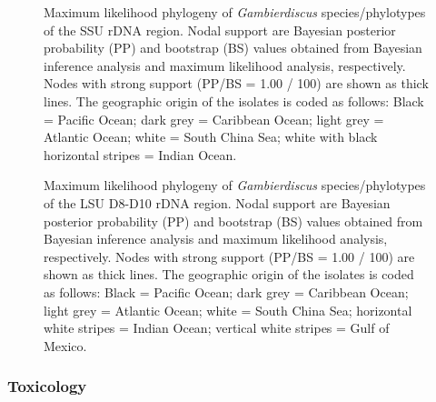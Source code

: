 \documentclass[12pt]{article}
\begin{document}
\begin{figure} 
\caption{Maximum likelihood phylogeny of \textit{Gambierdiscus} species/phylotypes of the SSU rDNA region. Nodal support are Bayesian posterior probability (PP) and bootstrap (BS) values obtained from Bayesian inference analysis and maximum likelihood analysis, respectively. Nodes with strong support (PP/BS = 1.00 / 100) are shown as thick lines. The geographic origin of the isolates is coded as follows: Black = Pacific Ocean; dark grey = Caribbean Ocean; light grey = Atlantic Ocean; white = South China Sea; white with black horizontal stripes = Indian Ocean.}
\label{fig:HGSSU} 
\end{figure} 
 
\FloatBarrier
\begin{figure} 
\caption{Maximum likelihood phylogeny of \textit{Gambierdiscus} species/phylotypes of the LSU D8-D10 rDNA region. Nodal support are Bayesian posterior probability (PP) and bootstrap (BS) values obtained from Bayesian inference analysis and maximum likelihood analysis, respectively. Nodes with strong support (PP/BS = 1.00 / 100) are shown as thick lines. The geographic origin of the isolates is coded as follows: Black = Pacific Ocean; dark grey = Caribbean Ocean; light grey = Atlantic Ocean; white = South China Sea; horizontal white stripes = Indian Ocean; vertical white stripes = Gulf of Mexico.} 
\label{fig:HGD8D10}
\end{figure} 
\FloatBarrier


\subsubsection{Toxicology}
\end{document}
